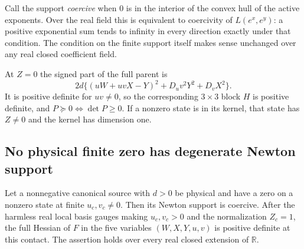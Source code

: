 Call the support \emph{coercive} when $0$ is in the interior of the
convex hull of the active exponents.  Over the real field this is
equivalent to coercivity of $L(e^x,e^y)$: a positive exponential
sum tends to infinity in every direction exactly under that condition.
The condition on the finite support itself makes sense unchanged over
any real closed coefficient field.

At $Z=0$ the signed part of the full parent is
\[
2d\{(uW+uvX-Y)^2+D_uv^2Y^2+D_vX^2\}.
\tag{SE2}
\]
It is positive definite for $uv\ne0$, so the corresponding
$3\times3$ block $H$ is positive definite, and
$P\succeq0\Longleftrightarrow\det P\geq0$.  If a nonzero state is
in its kernel, that state has $Z\ne0$ and the kernel has dimension one.

\subsection{No physical finite zero has degenerate Newton support}

\begin{theorem}
Let a nonnegative canonical source with $d>0$ be physical and have a
zero on a nonzero state at finite $u_c,v_c\ne0$.  Then its Newton
support is coercive.  After the harmless real local basis gauges making
$u_c,v_c>0$ and the normalization $Z_c=1$, the full Hessian of $F$ in
the five variables $(W,X,Y,u,v)$ is positive definite at this contact.
The assertion holds over every real closed extension of $\mathbb R$.
\end{theorem}

